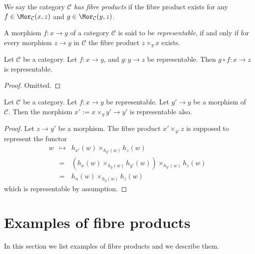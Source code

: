 \begin{definition}
\label{definition-has-fibre-products}
We say the category $\mathcal{C}$ {\it has fibre products} if
the fibre product exists for any $f\in \Mor_{\mathcal C}(x, z)$
and $g\in \Mor_{\mathcal C}(y, z)$.
\end{definition}

\begin{definition}
\label{definition-representable-morphism}
A morphism $f : x \to y$ of a category $\mathcal{C}$ is said to be
{\it representable}, if and only if for every morphism $z \to y$
in $\mathcal{C}$ the fibre product $z \times_y x$ exists.
\end{definition}

\begin{lemma}
\label{lemma-composition-representable}
Let $\mathcal{C}$ be a category.
Let $f : x \to y$, and $g : y \to z$ be representable.
Then $g \circ f : x \to z$ is representable.
\end{lemma}

\begin{proof}
Omitted.
\end{proof}

\begin{lemma}
\label{lemma-base-change-representable}
Let $\mathcal{C}$ be a category.
Let $f : x \to y$ be representable.
Let $y' \to y$ be a morphism of $\mathcal{C}$.
Then the morphism $x' := x \times_y y' \to y'$ is representable also.
\end{lemma}

\begin{proof}
Let $z \to y'$ be a morphism. The fibre product
$x' \times_{y'} z$ is supposed to represent the
functor
\begin{eqnarray*}
w & \mapsto & h_{x'}(w)\times_{h_{y'}(w)} h_z(w) \\
& = & (h_x(w) \times_{h_y(w)} h_{y'}(w)) \times_{h_{y'}(w)} h_z(w) \\
& = & h_n(w) \times_{h_y(w)} h_z(w)
\end{eqnarray*}
which is representable by assumption.
\end{proof}

\section{Examples of fibre products}
\label{section-example-fibre-products}

\noindent
In this section we list examples of fibre products and
we describe them.

